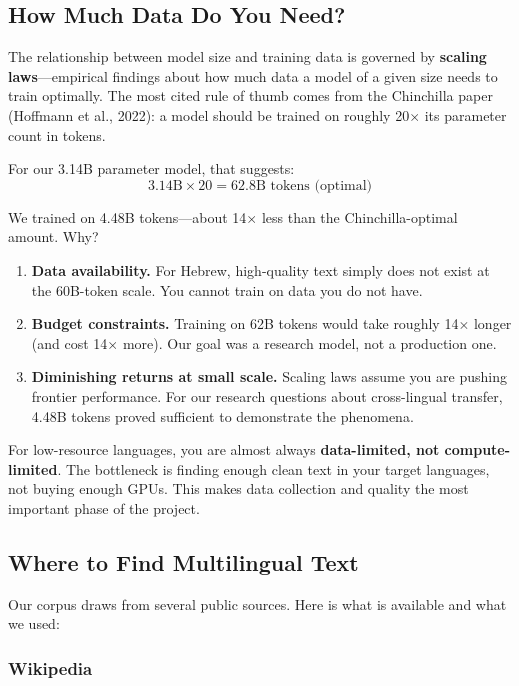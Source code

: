 \documentclass[11pt,a4paper]{article}
\begin{document}
\subsection{How Much Data Do You Need?}

The relationship between model size and training data is governed by \textbf{scaling laws}---empirical findings about how much data a model of a given size needs to train optimally. The most cited rule of thumb comes from the Chinchilla paper (Hoffmann et al., 2022): a model should be trained on roughly 20$\times$ its parameter count in tokens.

For our 3.14B parameter model, that suggests:
$$3.14\text{B} \times 20 = 62.8\text{B tokens (optimal)}$$

We trained on 4.48B tokens---about 14$\times$ less than the Chinchilla-optimal amount. Why?

\begin{enumerate}
    \item \textbf{Data availability.} For Hebrew, high-quality text simply does not exist at the 60B-token scale. You cannot train on data you do not have.
    \item \textbf{Budget constraints.} Training on 62B tokens would take roughly 14$\times$ longer (and cost 14$\times$ more). Our goal was a research model, not a production one.
    \item \textbf{Diminishing returns at small scale.} Scaling laws assume you are pushing frontier performance. For our research questions about cross-lingual transfer, 4.48B tokens proved sufficient to demonstrate the phenomena.
\end{enumerate}

\begin{keyidea}
For low-resource languages, you are almost always \textbf{data-limited, not compute-limited}. The bottleneck is finding enough clean text in your target languages, not buying enough GPUs. This makes data collection and quality the most important phase of the project.
\end{keyidea}

\subsection{Where to Find Multilingual Text}

Our corpus draws from several public sources. Here is what is available and what we used:

\subsubsection{Wikipedia}
\end{document}
